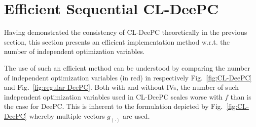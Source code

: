 \section{Efficient Sequential \acs{CL-DeePC}}\label{sec:Sequential}
Having demonstrated the consistency of \ac{CL-DeePC} theoretically in the previous section, this section presents an efficient implementation method w.r.t. the number of independent optimization variables.

The use of such an efficient method can be understood by comparing the number of independent optimization variables (in red) in respectively Fig.~\ref{fig:CL-DeePC} and Fig.~\ref{fig:regular-DeePC}. Both with and without \ac{IVs}, the number of such independent optimization variables used in \ac{CL-DeePC} scales worse with $f$ than is the case for \ac{DeePC}. This is inherent to the formulation depicted by Fig.~\ref{fig:CL-DeePC} whereby multiple vectors $g_{(\cdot)}$ are used.

